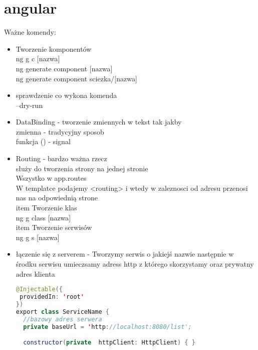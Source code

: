 \section{angular}
Ważne komendy:
\begin{itemize}
	\item Tworzenie komponentów
	\\ng g c [nazwa]
	\\ng generate component [nazwa]
	\\ng generate component sciezka/[nazwa]
	\item sprawdzenie co wykona komenda
	\\ --dry-run
	\item DataBinding - tworzenie zmiennych w tekst tak jakby
	\\ {{ zmienna }} - tradycyjny sposob
	\\ {{ funkcja () }} - signal
	\item Routing - bardzo ważna rzecz
	\\ służy do tworzenia strony na jednej stronie
	\\ Wszystko w app.routes
	\\ W templatce podajemy  <routing> i wtedy w zaleznosci od adresu przenosi nas na odpowiednią strone
	\\item Tworzenie klas 
	\\ng g class [nazwa]
	\\item Tworzenie serwisów
	\\ng g s [nazwa]
	\item łączenie się z serverem - Tworzymy serwis o jakiejś nazwie następnie w środku serwisu umieczsamy adress http z którego skorzystamy oraz prywatny adres klienta
	\begin{lstlisting}[language=Java, caption=Łączenie z serwerem]
@Injectable({
 providedIn: 'root'
})
export class ServiceName {
  //bazowy adres serwera
  private baseUrl = 'http://localhost:8080/list';

  constructor(private  httpClient: HttpClient) { }
	

\end{lstlisting}
\end{itemize}
